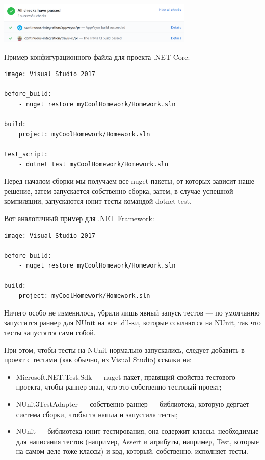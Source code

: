 \documentclass[a5paper]{article}
\begin{document}
\begin{center}
	\includegraphics[width=0.7\textwidth]{appVeyorSuccess.png}
\end{center}

Пример конфигурационного файла для проекта .NET Core:

\begin{verbatim}
image: Visual Studio 2017 

before_build: 
    - nuget restore myCoolHomework/Homework.sln

build: 
    project: myCoolHomework/Homework.sln

test_script: 
    - dotnet test myCoolHomework/Homework.sln
\end{verbatim}

Перед началом сборки мы получаем все nuget-пакеты, от которых зависит наше решение, затем запускается собственно сборка, затем, в случае успешной компиляции, запускаются юнит-тесты командой dotnet test.

Вот аналогичный пример для .NET Framework:

\begin{verbatim}
image: Visual Studio 2017 

before_build: 
    - nuget restore myCoolHomework/Homework.sln

build: 
    project: myCoolHomework/Homework.sln
\end{verbatim}

Ничего особо не изменилось, убрали лишь явный запуск тестов --- по умолчанию запустится раннер для NUnit на все .dll-ки, которые ссылаются на NUnit, так что тесты запустятся сами собой.

При этом, чтобы тесты на NUnit нормально запускались, следует добавить в проект с тестами (как обычно, из Visual Studio) ссылки на:
\begin{itemize}
	\item Microsoft.NET.Test.Sdk --- nuget-пакет, правящий свойства тестового проекта, чтобы раннер знал, что это собственно тестовый проект;
	\item NUnit3TestAdapter --- собственно раннер --- библиотека, которую дёргает система сборки, чтобы та нашла и запустила тесты;
	\item NUnit --- библиотека юнит-тестирования, она содержит классы, необходимые для написания тестов (например, Assert и атрибуты, например, Test, которые на самом деле тоже классы) и код, который, собственно, исполняет тесты.
\end{itemize}
\end{document}
